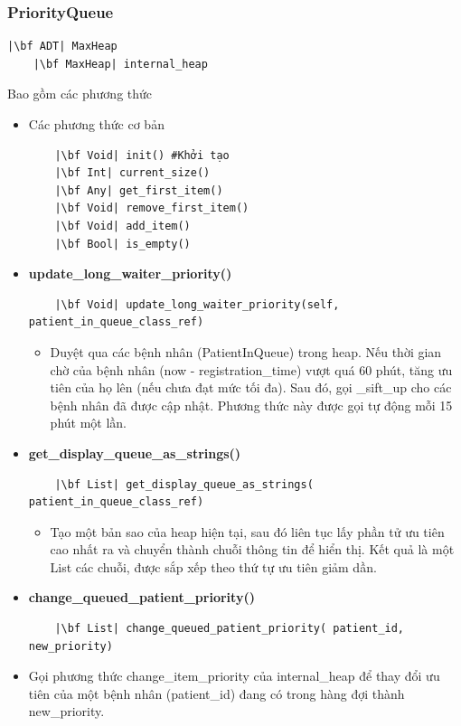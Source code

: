 \subsubsection{PriorityQueue}
\begin{verbatim}
|\bf ADT| MaxHeap
    |\bf MaxHeap| internal_heap
\end{verbatim}
Bao gồm các phương thức
\begin{itemize}
    \item Các phương thức cơ bản
\begin{verbatim}
    |\bf Void| init() #Khởi tạo
    |\bf Int| current_size()
    |\bf Any| get_first_item()
    |\bf Void| remove_first_item()
    |\bf Void| add_item()
    |\bf Bool| is_empty()
\end{verbatim}
\item \textbf{update\_long\_waiter\_priority()}
\begin{verbatim}
    |\bf Void| update_long_waiter_priority(self, patient_in_queue_class_ref)
\end{verbatim}
\begin{itemize}
    \item Duyệt qua các bệnh nhân (PatientInQueue) trong heap. Nếu thời gian chờ của bệnh nhân (now - registration\_time) vượt quá 60 phút, tăng ưu tiên của họ lên (nếu chưa đạt mức tối đa). Sau đó, gọi \_sift\_up cho các bệnh nhân đã được cập nhật. Phương thức này được gọi tự động mỗi 15 phút một lần.
\end{itemize}
\item \textbf{get\_display\_queue\_as\_strings()}
\begin{verbatim}
    |\bf List| get_display_queue_as_strings( patient_in_queue_class_ref)
\end{verbatim}
\begin{itemize}
    \item Tạo một bản sao của heap hiện tại, sau đó liên tục lấy phần tử ưu tiên cao nhất ra và chuyển thành chuỗi thông tin để hiển thị. Kết quả là một List các chuỗi, được sắp xếp theo thứ tự ưu tiên giảm dần.
\end{itemize}
\item \textbf{change\_queued\_patient\_priority()}
\begin{verbatim}
    |\bf List| change_queued_patient_priority( patient_id, new_priority)
\end{verbatim}
\item Gọi phương thức change\_item\_priority của internal\_heap để thay đổi ưu tiên của một bệnh nhân (patient\_id) đang có trong hàng đợi thành new\_priority.
\end{itemize}
